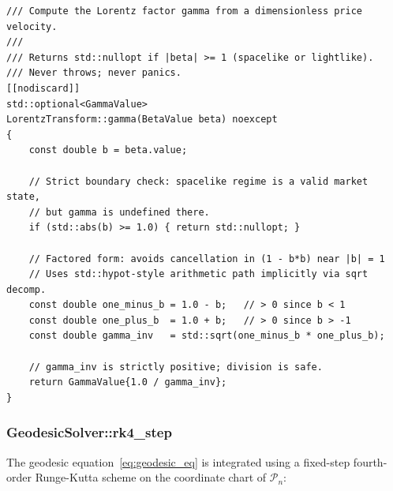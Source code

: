 \begin{lstlisting}[style=cpp20, caption={Lorentz factor with boundary protection.}]
/// Compute the Lorentz factor gamma from a dimensionless price velocity.
///
/// Returns std::nullopt if |beta| >= 1 (spacelike or lightlike).
/// Never throws; never panics.
[[nodiscard]]
std::optional<GammaValue>
LorentzTransform::gamma(BetaValue beta) noexcept
{
    const double b = beta.value;

    // Strict boundary check: spacelike regime is a valid market state,
    // but gamma is undefined there.
    if (std::abs(b) >= 1.0) { return std::nullopt; }

    // Factored form: avoids cancellation in (1 - b*b) near |b| = 1
    // Uses std::hypot-style arithmetic path implicitly via sqrt decomp.
    const double one_minus_b = 1.0 - b;   // > 0 since b < 1
    const double one_plus_b  = 1.0 + b;   // > 0 since b > -1
    const double gamma_inv   = std::sqrt(one_minus_b * one_plus_b);

    // gamma_inv is strictly positive; division is safe.
    return GammaValue{1.0 / gamma_inv};
}
\end{lstlisting}

\subsubsection{GeodesicSolver::rk4\_step}

The geodesic equation~\eqref{eq:geodesic_eq} is integrated using a
fixed-step fourth-order Runge-Kutta scheme on the coordinate chart of
$\mathcal{P}_n$:


